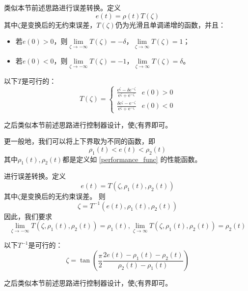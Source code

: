 类似本节前述思路进行误差转换。定义\[e(t)=\rho(t)T(\zeta)\]
其中$\zeta$是变换后的无约束误差，$T(\zeta)$仍为光滑且单调递增的函数，并且：
\begin{itemize}[leftmargin=1em]
    \item 若$e(0)>0$，则$\lim\limits_{\zeta\to-\infty}T(\zeta)=-\delta$，$\lim\limits_{\zeta\to\infty}T(\zeta)=1$；
    \item 若$e(0)<0$，则$\lim\limits_{\zeta\to-\infty}T(\zeta)=-1$，$\lim\limits_{\zeta\to\infty}T(\zeta)=\delta$。
\end{itemize}
\newpage
\begin{example}
    以下$T$是可行的：
    \[T(\zeta) = \begin{cases}
        \frac{\mathrm{e}^\zeta-\delta \mathrm{e}^{-\zeta}}{\mathrm{e}^\zeta+ \mathrm{e}^{-\zeta}}&e(0)>0\\
        \frac{\delta\mathrm{e}^\zeta- \mathrm{e}^{-\zeta}}{\mathrm{e}^\zeta+ \mathrm{e}^{-\zeta}}&e(0)<0
    \end{cases}\]
\end{example}
之后类似本节前述思路进行控制器设计，使$\zeta$有界即可。

更一般地，我们可以将上下界取为不同的函数，即
\[\rho_1(t)<e(t)<\rho_2(t)\]
其中$\rho_1(t),\rho_2(t)$都是定义如 \ref{performance_func} 的性能函数。

进行误差转换。定义\[e(t)=T(\zeta,\rho_1(t),\rho_2(t))\]
其中$\zeta$是变换后的无约束误差。
则\[\zeta = T^{-1}(e(t),\rho_1(t),\rho_2(t))\]
因此，我们要求\[\lim\limits_{\zeta\to-\infty}T(\zeta,\rho_1(t),\rho_2(t))=\rho_1(t),\lim\limits_{\zeta\to\infty}T(\zeta,\rho_1(t),\rho_2(t))=\rho_2(t)\]
\begin{example}
    以下$T^{-1}$是可行的：
    \[\zeta = \tan\left(\frac{\pi}{2}\frac{2e(t)-\rho_1(t)-\rho_2(t)}{\rho_2(t)-\rho_1(t)}\right)\]
\end{example}

之后类似本节前述思路进行控制器设计，使$\zeta$有界即可。
